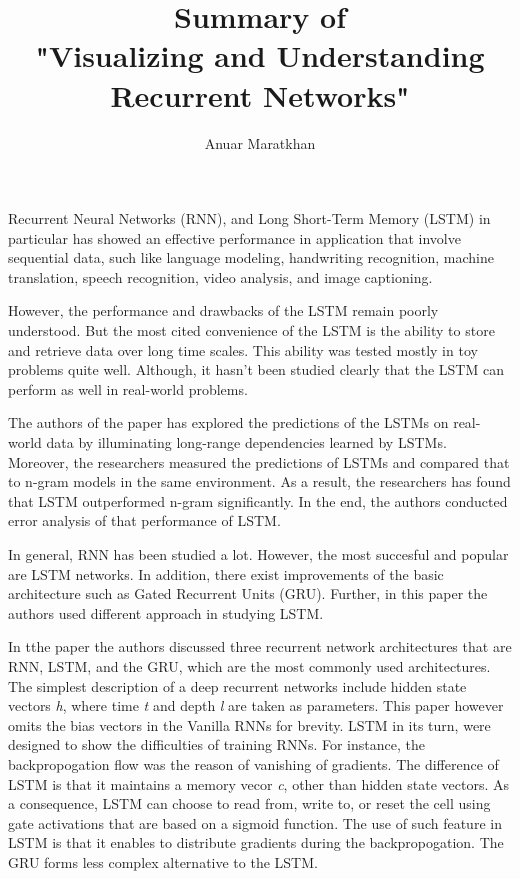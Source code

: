 \documentclass{IEEEtran}
\begin{document}
\title{Summary of \\"Visualizing and Understanding Recurrent Networks"}

\author{Anuar Maratkhan}

\maketitle

Recurrent Neural Networks (RNN), and Long Short-Term Memory (LSTM) in particular has showed an effective performance in application that involve sequential data, such like language modeling, handwriting recognition, machine translation, speech recognition, video analysis, and image captioning.

However, the performance and drawbacks of the LSTM remain poorly understood. But the most cited convenience of the LSTM is the ability to store and retrieve data over long time scales. This ability was tested mostly in toy problems quite well. Although, it hasn't been studied clearly that the LSTM can perform as well in real-world problems.

The authors of the paper has explored the predictions of the LSTMs on real-world data by illuminating long-range dependencies learned by LSTMs. Moreover, the researchers measured the predictions of LSTMs and compared that to n-gram models in the same environment. As a result, the researchers has found that LSTM outperformed n-gram significantly. In the end, the authors conducted error analysis of that performance of LSTM.

In general, RNN has been studied a lot. However, the most succesful and popular are LSTM networks. In addition, there exist improvements of the basic architecture such as Gated Recurrent Units (GRU). Further, in this paper the authors used different approach in studying LSTM.

In tthe paper the authors discussed three recurrent network architectures that are RNN, LSTM, and the GRU, which are the most commonly used architectures. The simplest description of a deep recurrent networks include hidden state vectors \textit{h}, where time \textit{t} and depth \textit{l} are taken as parameters. This paper however omits the bias vectors in the Vanilla RNNs for brevity. LSTM in its turn, were designed to show the difficulties of training RNNs. For instance, the backpropogation flow was the reason of vanishing of gradients. The difference of LSTM is that it maintains a memory vecor \textit{c}, other than hidden state vectors. As a consequence, LSTM can choose to read from, write to, or reset the cell using gate activations that are based on a sigmoid function. The use of such feature in LSTM is that it enables to distribute gradients during the backpropogation. The GRU forms less complex alternative to the LSTM.
\end{document}
